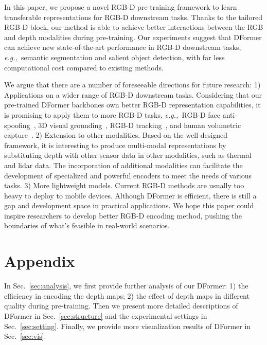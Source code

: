 \documentclass{article}
\newcommand{\secref}[1]{Sec.~\ref{#1}}
\def\eg{\emph{e.g.,~}}
\newcommand{\nMethod}{DFormer}
\begin{document}
In this paper, we propose a novel RGB-D pre-training framework to learn transferable representations for RGB-D downstream tasks. 
Thanks to the tailored RGB-D block, our method is able to achieve better interactions between the RGB and depth modalities during pre-training.
Our experiments suggest that \nMethod{} can achieve new state-of-the-art performance in RGB-D downstream tasks, \eg semantic segmentation and salient object detection, with far less computational cost compared to existing methods.



We argue that there are a number of foreseeable directions for future research:
1) 
Applications on a wider range of RGB-D downstream tasks.
Considering that our pre-trained \nMethod{} backbones own better RGB-D representation capabilities, it is promising to apply them to more RGB-D tasks, \eg RGB-D face anti-spoofing~\citep{george2021cross}, 3D visual grounding~\citep{liu2021refer}, RGB-D tracking~\citep{yan2021depthtrack}, and human volumetric capture~\citep{yu2021function4d}.
2) 
Extension to other modalities. 
Based on the well-designed framework, it is interesting to produce multi-modal representations by substituting depth with other sensor data in other modalities, such as thermal and lidar data. 
The incorporation of additional modalities can facilitate the development of specialized and powerful encoders to meet the needs of various tasks. 
3) More lightweight models.
Current RGB-D methods are usually too heavy to deploy to mobile devices.
Although \nMethod{} is efficient, there is still a gap and development space in practical applications.
We hope this paper could inspire researchers to develop better RGB-D encoding method, pushing the boundaries of what's feasible in real-world scenarios.











\section*{Appendix}
\appendix

In \secref{sec:analysis}, we first provide further analysis of our \nMethod{}: 1) the efficiency in encoding the depth maps; 2) the effect of depth maps in different quality during pre-training.
Then we present more detailed descriptions of \nMethod{} in \secref{sec:structure} and the experimental settings in \secref{sec:setting}.
Finally, we provide more visualization results of \nMethod{} in \secref{sec:vis}.
\end{document}
